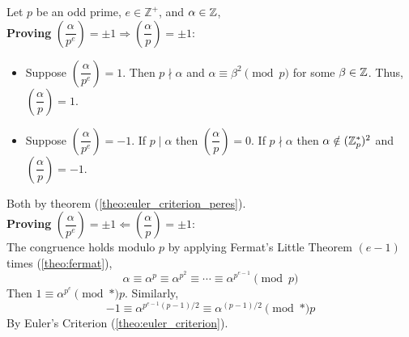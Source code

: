 \begin{Proof}
    Let $p$ be an odd prime, $e\in\mathbb{Z^+}$, and $\alpha\in\mathbb{Z}$,\\

    \noindent
    \textbf{Proving} $\left(\dfrac{\alpha}{p^e}\right)=\pm1\Longrightarrow\left(\dfrac{\alpha}{p}\right)=\pm1$:
    \begin{itemize}
        \item Suppose $\left(\dfrac{\alpha}{p^e}\right)=1$. Then $p\nmid\alpha$ and $\alpha\equiv\beta^2\pmod{p}$ for some $\beta\in\mathbb{Z}$. Thus, $\left(\dfrac{\alpha}{p}\right)=1$.
        \item Suppose $\left(\dfrac{\alpha}{p^e}\right)=-1$. If $p\mid\alpha$ then $\left(\dfrac{\alpha}{p}\right)=0$. If $p\nmid\alpha$ then $\alpha\notin(\mathbb{Z}_p^*)^2$ and $\left(\dfrac{\alpha}{p}\right)=-1$.
    \end{itemize}
    \noindent
    Both by theorem (\ref{theo:euler_criterion_peres}).\\

    \noindent
    \textbf{Proving} $\left(\dfrac{\alpha}{p^e}\right)=\pm1\Longleftarrow\left(\dfrac{\alpha}{p}\right)=\pm1$:\\
    The congruence holds modulo $p$ by applying Fermat's Little Theorem $(e-1)$ times (\ref{theo:fermat}),
    \[\alpha\equiv\alpha^p\equiv \alpha^{p^2}\equiv\cdots\equiv\alpha^{p^{e-1}}\pmod{p}\] 
    \noindent
    Then $1\equiv \alpha^{p^e}\pmod*{p}$. Similarly,
    \[
        -1\equiv \alpha^{p^{e-1}(p-1)/2}\equiv\alpha^{(p-1)/2}\pmod*{p}
    \]
    \noindent
    By Euler's Criterion (\ref{theo:euler_criterion}).
\end{Proof}

